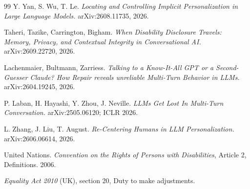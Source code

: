 \documentclass[11pt]{article}
\begin{document}
\begin{thebibliography}{99}
 Y. Yan, S. Wu, T. Le. \emph{Locating and Controlling Implicit
Personalization in Large Language Models.} arXiv:2608.11735, 2026.

 Taheri, Tazike, Carrington, Bigham. \emph{When Disability
Disclosure Travels: Memory, Privacy, and Contextual Integrity in Conversational AI.}
arXiv:2609.22720, 2026.

 Lachenmaier, Bultmann, Zarriess. \emph{Talking to a
Know-It-All GPT or a Second-Guesser Claude? How Repair reveals unreliable Multi-Turn
Behavior in LLMs.} arXiv:2604.19245, 2026.

 P. Laban, H. Hayashi, Y. Zhou, J. Neville. \emph{LLMs Get Lost
In Multi-Turn Conversation.} arXiv:2505.06120; ICLR 2026.

 L. Zhang, J. Liu, T. August. \emph{Re-Centering Humans in LLM
Personalization.} arXiv:2606.06614, 2026.

 United Nations. \emph{Convention on the Rights of Persons with
Disabilities}, Article 2, Definitions. 2006.

 \emph{Equality Act 2010} (UK), section 20, Duty to make adjustments.

\end{thebibliography}
\end{document}

